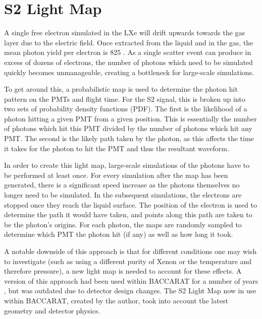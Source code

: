 \section{S2 Light Map}
\label{sec:s2lightmap}
\par
A single free electron simulated in the LXe will drift upwards towards the gas layer due to the electric field.
Once extracted from the liquid and in the gas, the mean photon yield per electron is 825 \cite{NoPhotonsPerElectron}.
As a single scatter event can produce in excess of dozens of electrons, the number of photons which need to be simulated quickly becomes unmanageable, creating a bottleneck for large-scale simulations.
\par
To get around this, a probabilistic map is used to determine the photon hit pattern on the PMTs and flight time.
For the S2 signal, this is broken up into two sets of probability density functions (PDF).
The first is the likelihood of a photon hitting a given PMT from a given position.
This is essentially the number of photons which hit this PMT divided by the number of photons which hit any PMT.
The second is the likely path taken by the photon, as this affects the time it takes for the photon to hit the PMT and thus the resultant waveform.
\par
In order to create this light map, large-scale simulations of the photons have to be performed at least once.
For every simulation after the map has been generated, there is a significant speed increase as the photons themselves no longer need to be simulated.
In the subsequent simulations, the electrons are stopped once they reach the liquid surface.
The position of the electron is used to determine the path it would have taken, and points along this path are taken to be the photon's origins. %
For each photon, the maps are randomly sampled to determine which PMT the photon hit (if any) as well as how long it took.

\par
A notable downside of this approach is that for different conditions one may wish to investigate (such as using a different purity of Xenon or the temperature and therefore pressure), a new light map is needed to account for these effects.
A version of this approach had been used within BACCARAT for a number of years \cite{lz_simulations_ref}, but was outdated due to detector design changes.
The S2 Light Map now in use within BACCARAT, created by the author, took into account the latest geometry and detector physics.

